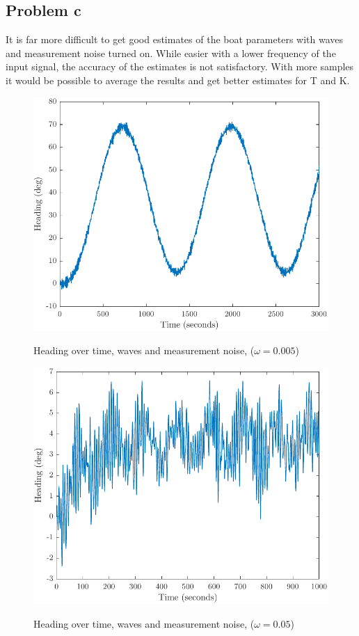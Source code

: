 \subsection{Problem c}
It is far more difficult to get good estimates of the boat parameters with waves and measurement noise
turned on. While easier with a lower frequency of the input signal, the accuracy of the estimates is not
satisfactory. With more samples it would be possible to average the results and get better estimates for
T and K. 

\begin{figure}[ht]
    \centering
    \begin{minipage}[b]{0.48\textwidth}
        \includegraphics[width=\textwidth]{"images/1c-omega_lik_0005"}
        \label{fig:1c-omega=0.0005}
        \caption{Heading over time, waves and measurement noise, ($\omega = 0.005$)}
    \end{minipage}
    \hfill
    \begin{minipage}[b]{0.48\textwidth}
        \includegraphics[width=\textwidth]{"images/1c-omega_lik_005"}
        \label{fig:1c-omega=0.005}
        \caption{Heading over time, waves and measurement noise, ($\omega = 0.05$)}
    \end{minipage}
\end{figure}

